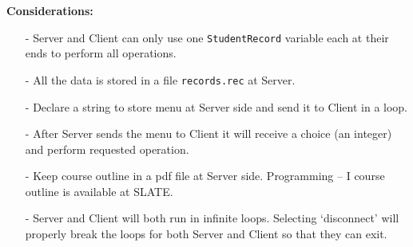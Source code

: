 \documentclass[12pt,a4paper]{article}
\begin{document}
\noindent\textbf{Considerations:}
\begin{itemize}
\item[-] Server and Client can only use one \verb|StudentRecord| variable each at their ends to perform all operations.
\item[-] All the data is stored in a file \verb|records.rec| at Server.
\item[-] Declare a string to store menu at Server side and send it to Client in a loop.
\item[-] After Server sends the menu to Client it will receive a choice (an integer) and perform requested operation.
\item[-] Keep course outline in a pdf file at Server side. Programming -- I course outline is available at SLATE.
\item[-] Server and Client will both run in infinite loops. Selecting `disconnect' will properly break the loops for both Server and Client so that they can exit.
\end{itemize}
\end{document}
